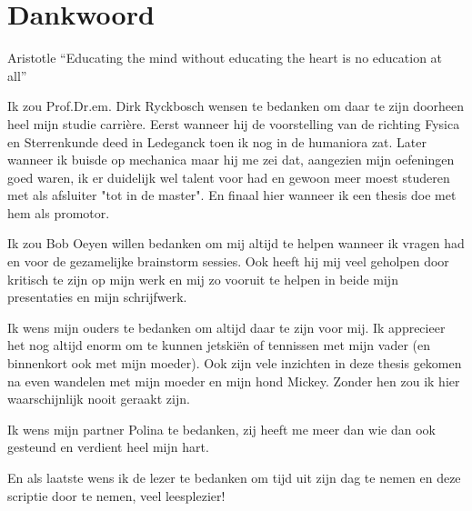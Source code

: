 \chapter*{Dankwoord}
\begin{chapquote}{Aristotle}
``Educating the mind without educating the heart is no education at all''
\end{chapquote}
Ik zou Prof.Dr.em. Dirk Ryckbosch wensen te bedanken om daar te zijn doorheen
heel mijn studie carrière. Eerst wanneer hij de voorstelling van de richting
Fysica en Sterrenkunde deed in Ledeganck toen ik nog in de humaniora zat. Later wanneer ik buisde op
mechanica maar hij me zei dat, aangezien mijn oefeningen goed waren, ik er
duidelijk wel talent voor had en gewoon meer moest studeren met als afsluiter
"tot in de master". En finaal hier wanneer ik een thesis doe met hem als
promotor.

Ik zou Bob Oeyen willen bedanken om mij altijd te helpen wanneer ik
vragen had en voor de gezamelijke brainstorm sessies. 
Ook heeft hij mij veel geholpen door kritisch te zijn op
mijn werk en mij zo vooruit te helpen in beide mijn presentaties en
mijn schrijfwerk.

Ik wens mijn ouders te bedanken om altijd daar te zijn voor mij.
Ik apprecieer het nog altijd enorm om te kunnen jetskiën of
tennissen met mijn vader (en binnenkort ook met mijn moeder).
Ook zijn vele inzichten in deze thesis gekomen na even wandelen
met mijn moeder en mijn hond Mickey.  Zonder hen zou ik hier
waarschijnlijk nooit geraakt zijn.

Ik wens mijn partner Polina te bedanken, zij
heeft me meer dan wie dan ook gesteund en verdient heel mijn
hart.

En als laatste wens ik de lezer te bedanken om tijd uit zijn 
dag te nemen en deze scriptie door te nemen, veel leesplezier! 

